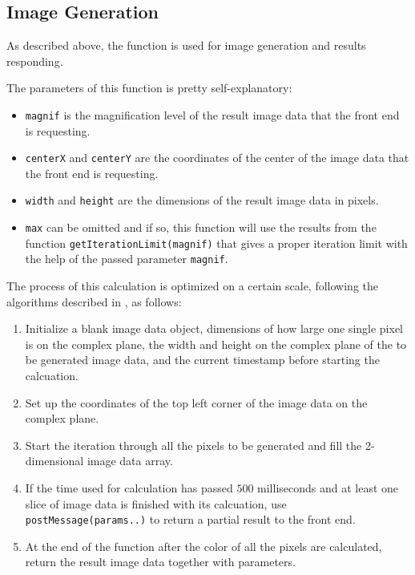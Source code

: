 \subsection{Image Generation}

As described above, the function  is used for image generation and results responding.

The parameters of this function is pretty self-explanatory:

\begin{itemize}
  \item \texttt{magnif} is the magnification level of the result image data that the front end is requesting.
  \item \texttt{centerX} and \texttt{centerY} are the coordinates of the center of the image data that the front end is requesting.
  \item \texttt{width} and \texttt{height} are the dimensions of the result image data in pixels.
  \item \texttt{max} can be omitted and if so, this function will use the results from the function \texttt{getIterationLimit(magnif)} that gives a proper iteration limit with the help of the passed parameter \texttt{magnif}.
\end{itemize}

The process of this calculation is optimized on a certain scale, following the algorithms described in , as follows:

\begin{enumerate}
  \item Initialize a blank image data object, dimensions of how large one single pixel is on the complex plane, the width and height on the complex plane of the to be generated image data, and the current timestamp before starting the calcuation.
  \item Set up the coordinates of the top left corner of the image data on the complex plane.
  \item Start the iteration through all the pixels to be generated and fill the 2-dimensional image data array.
  \item If the time used for calculation has passed $500$ milliseconds and at least one slice of image data is finished with its calcuation, use \texttt{postMessage(params..)} to return a partial result to the front end.
  \item At the end of the function after the color of all the pixels are calculated, return the result image data together with parameters.
\end{enumerate}

